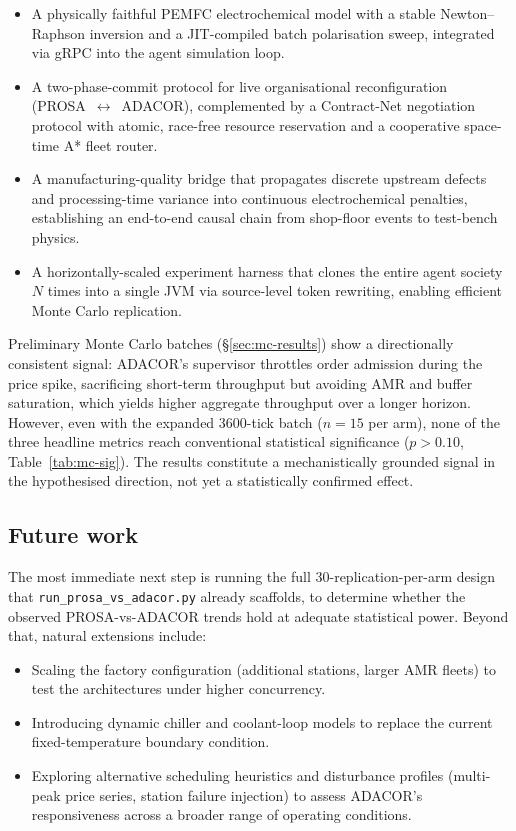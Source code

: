 \documentclass[twocolumn,10pt,a4paper]{article}
\newcommand{\file}[1]{\texttt{#1}}
\begin{document}
\begin{itemize}
\item A physically faithful PEMFC electrochemical model with a stable Newton--Raphson inversion and a JIT-compiled batch polarisation sweep, integrated via gRPC into the agent simulation loop.
\item A two-phase-commit protocol for live organisational reconfiguration (PROSA~$\leftrightarrow$~ADACOR), complemented by a Contract-Net negotiation protocol with atomic, race-free resource reservation and a cooperative space-time A* fleet router.
\item A manufacturing-quality bridge that propagates discrete upstream defects and processing-time variance into continuous electrochemical penalties, establishing an end-to-end causal chain from shop-floor events to test-bench physics.
\item A horizontally-scaled experiment harness that clones the entire agent society $N$ times into a single JVM via source-level token rewriting, enabling efficient Monte Carlo replication.
\end{itemize}

Preliminary Monte Carlo batches (\S\ref{sec:mc-results}) show a directionally consistent signal: ADACOR's supervisor throttles order admission during the price spike, sacrificing short-term throughput but avoiding AMR and buffer saturation, which yields higher aggregate throughput over a longer horizon. However, even with the expanded 3600-tick batch ($n{=}15$ per arm), none of the three headline metrics reach conventional statistical significance ($p > 0.10$, Table~\ref{tab:mc-sig}). The results constitute a mechanistically grounded signal in the hypothesised direction, not yet a statistically confirmed effect.

\subsection{Future work}
The most immediate next step is running the full 30-replication-per-arm design that \file{run\_prosa\_vs\_adacor.py} already scaffolds, to determine whether the observed PROSA-vs-ADACOR trends hold at adequate statistical power. Beyond that, natural extensions include:

\begin{itemize}
\item Scaling the factory configuration (additional stations, larger AMR fleets) to test the architectures under higher concurrency.
\item Introducing dynamic chiller and coolant-loop models to replace the current fixed-temperature boundary condition.
\item Exploring alternative scheduling heuristics and disturbance profiles (multi-peak price series, station failure injection) to assess ADACOR's responsiveness across a broader range of operating conditions.
\end{itemize}
\end{document}
